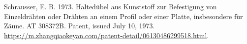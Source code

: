 \documentclass[
]{article}
\author{Dietmar Gerald SCHRAUSSER}
\date{14.04.2026}
\newlength{\cslhangindent}
\newlength{\cslentryspacingunit} %
\newenvironment{CSLReferences}[2] %
 {%
  \setlength{\parindent}{0pt}
  \ifodd #1
  \let\oldpar\par
  \def\par{\hangindent=\cslhangindent\oldpar}
  \fi
  \setlength{\parskip}{#2\cslentryspacingunit}
 }%
 {}
\begin{document}
\hypertarget{refs}{}
\begin{CSLReferences}{1}{0}
\leavevmode{}%
Schrausser, E. B. 1973. {Haltedübel aus Kunststoff zur Befestigung von
Einzeldrähten oder Drähten an einem Profil oder einer Platte,
insbesondere für Zäune}. AT 308372B. Patent, issued July 10, 1973.
\url{https://m.zhangqiaokeyan.com/patent-detail/06130486299518.html}.

\end{CSLReferences}
\end{document}
